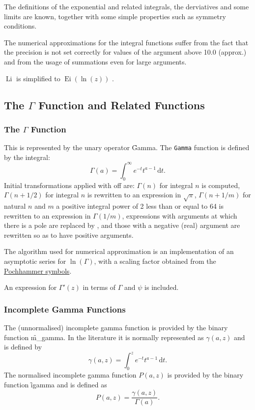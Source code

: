The definitions of the exponential and related integrals, the
derviatives and some limits are known, together with some simple
properties such as symmetry conditions.

The numerical approximations for the integral functions suffer
from the fact that the precision is not set correctly for
values of the argument above 10.0 (approx.) and from the
usage of summations even for large arguments.

$\mathop{\mathrm{Li}(z)}$ is simplified to $\mathop{\mathrm{Ei}}(\ln(z))$ .

\subsection{The \texorpdfstring{$\Gamma$}{Gamma} Function and Related Functions}

\subsubsection{The \texorpdfstring{$\Gamma$}{Gamma} Function}
\hypertarget{GAMMF}{}
\hypertarget{operator:GAMMA}{}
\hypertarget{operator:IGAMMA}{}
\hypertarget{operator:POLYGAMMA}{}
\hypertarget{operator:PSI}{}

This is represented by the unary operator \f{Gamma}.
The \texttt{Gamma} function is defined by the integral:
\[ \Gamma(a) = \int_0^\infty e^{-t}t^{a-1}\, \mathrm{d}t.\]
Initial transformations applied with  off are: $\Gamma(n)$ for
integral $n$ is computed, $\Gamma(n+1/2)$ for integral $n$ is rewritten to
an expression in $\sqrt\pi$, $\Gamma(n+1/m)$ for natural $n$ and $m$ a
positive integral power of 2 less than or equal to 64 is rewritten to an
expression in $\Gamma(1/m)$, expressions with arguments at which there is a
pole are replaced by , and those with a negative (real)
argument are rewritten so as to have positive arguments.

The algorithm used for numerical approximation is an implementation of an
asymptotic series for $\ln(\Gamma)$, with a scaling factor obtained from
the \hyperlink{POCH}{Pochhammer symbols}.

An expression for $\Gamma'(z)$ in terms of $\Gamma$ and $\psi$ is
included.

\subsubsection{Incomplete Gamma Functions}
The (unnormalised) incomplete gamma function is provided by the binary function
\f{m\_gamma}. In the literature it is normally represented as $\gamma(a,z)$
and is defined by
\[ \gamma(a, z) = \int_0^z e^{-t}t^{a-1}\, \mathrm{d}t.\]
The normalised incomplete gamma function $P(a,z)$ is provided by the binary
function \f{igamma} and is defined as
\[P(a,z) = \frac{\gamma(a,z)}{\Gamma(a)}.\]

